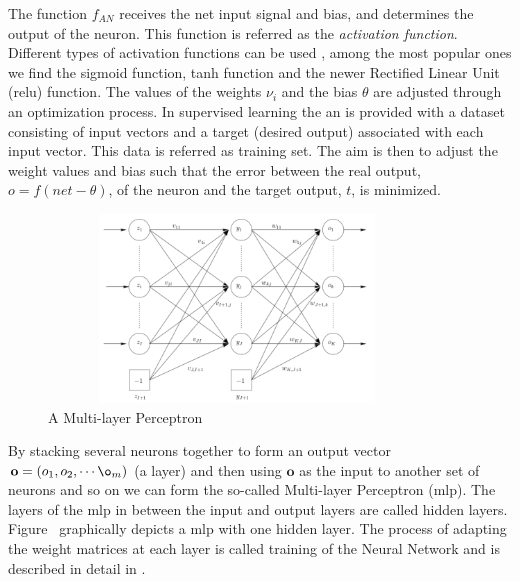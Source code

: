 The function $f_{AN}$ receives the net input signal and bias, and determines the output of the neuron. This function is referred as the \textit{activation function}. Different types of activation functions can be used \cite{Engelbrecht2007}, among the most popular ones we find the sigmoid function, tanh function and the newer Rectified Linear Unit (\gls{relu}) function. The values of the weights $\nu_i$ and the bias $\theta$ are adjusted through an optimization process. In supervised learning the \gls{an} is provided with a dataset consisting of input vectors and a target (desired output) associated with each input vector. This data is referred as training set. The aim is then to adjust the weight values and bias such that the error between the real output, $o = f(net - \theta)$, of the neuron and the target output, $t$, is minimized.

\begin{figure}[h]
    \centering
    \includegraphics[width = 100mm, height = 50mm]{img/artificial_neural_network.png}
    \caption{A Multi-layer Perceptron} 
    \label{fig:ann_1}
\end{figure}

By stacking several neurons together to form an output vector $\mathbf{o} = (o_1, o_2, \cdots \o_m)$ (a layer) and then using $\mathbf{o}$ as the input to another set of neurons and so on we can form the so-called Multi-layer Perceptron (\gls{mlp}). The layers of the \gls{mlp} in between the input and output layers are called hidden layers. Figure \ graphically depicts a \gls{mlp} with one hidden layer. The process of adapting the weight matrices at each layer is called training of the Neural Network and is described in detail in \cite{Engelbrecht2007}.